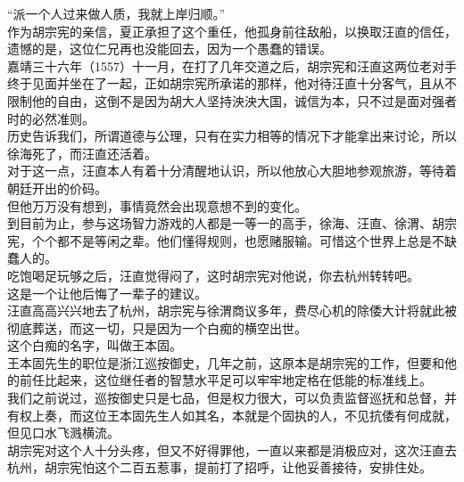\begin{multicols}{\theparacolNo}
“派一个人过来做人质，我就上岸归顺。”\\

作为胡宗宪的亲信，夏正承担了这个重任，他孤身前往敌船，以换取汪直的信任，遗憾的是，这位仁兄再也没能回去，因为一个愚蠢的错误。\\

嘉靖三十六年（1557）十一月，在打了几年交道之后，胡宗宪和汪直这两位老对手终于见面并坐在了一起，正如胡宗宪所承诺的那样，他对待汪直十分客气，且从不限制他的自由，这倒不是因为胡大人坚持泱泱大国，诚信为本，只不过是面对强者时的必然准则。\\

历史告诉我们，所谓道德与公理，只有在实力相等的情况下才能拿出来讨论，所以徐海死了，而汪直还活着。\\

对于这一点，汪直本人有着十分清醒地认识，所以他放心大胆地参观旅游，等待着朝廷开出的价码。\\

但他万万没有想到，事情竟然会出现意想不到的变化。\\

到目前为止，参与这场智力游戏的人都是一等一的高手，徐海、汪直、徐渭、胡宗宪，个个都不是等闲之辈。他们懂得规则，也愿赌服输。可惜这个世界上总是不缺蠢人的。\\

吃饱喝足玩够之后，汪直觉得闷了，这时胡宗宪对他说，你去杭州转转吧。\\

这是一个让他后悔了一辈子的建议。\\

汪直高高兴兴地去了杭州，胡宗宪与徐渭商议多年，费尽心机的除倭大计将就此被彻底葬送，而这一切，只是因为一个白痴的横空出世。\\

这个白痴的名字，叫做王本固。\\

王本固先生的职位是浙江巡按御史，几年之前，这原本是胡宗宪的工作，但要和他的前任比起来，这位继任者的智慧水平足可以牢牢地定格在低能的标准线上。\\

我们之前说过，巡按御史只是七品，但是权力很大，可以负责监督巡抚和总督，并有权上奏，而这位王本固先生人如其名，本就是个固执的人，不见抗倭有何成就，但见口水飞溅横流。\\

胡宗宪对这个人十分头疼，但又不好得罪他，一直以来都是消极应对，这次汪直去杭州，胡宗宪怕这个二百五惹事，提前打了招呼，让他妥善接待，安排住处。\\


\end{multicols}
